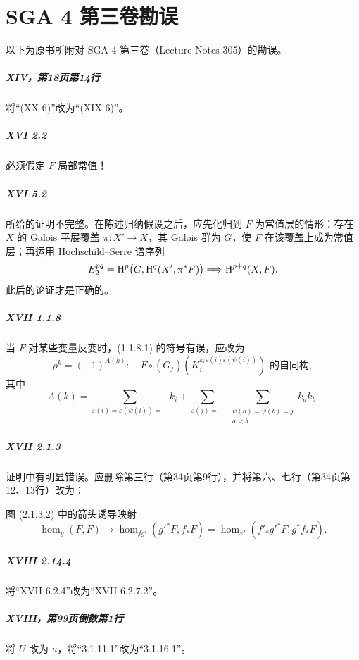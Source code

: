 \chapter{SGA 4 第三卷勘误}
以下为原书所附对 SGA 4 第三卷（Lecture Notes 305）的勘误。

\paragraph{XIV，第18页第14行}
将“(XX 6)”改为“(XIX 6)”。

\paragraph{XVI 2.2}
必须假定 $F$ 局部常值！

\paragraph{XVI 5.2}
所给的证明不完整。在陈述归纳假设之后，应先化归到 $F$ 为常值层的情形：存在 $X$ 的 Galois 平展覆盖 $\pi:X'\to X$，其 Galois 群为 $G$，使 $F$ 在该覆盖上成为常值层；再运用 Hochschild--Serre 谱序列
\[
E_2^{pq}=\operatorname{H}^p\bigl(G,\operatorname{H}^q(X',\pi^*F)\bigr)\Longrightarrow\operatorname{H}^{p+q}(X,F).
\]
此后的论证才是正确的。

\paragraph{XVII 1.1.8}
当 $F$ 对某些变量反变时，(1.1.8.1) 的符号有误，应改为
\begin{equation*}\tag{1.1.8.1}
\rho^{\underline k}=(-1)^{A(\underline k)}:\quad
F\circ(G_j)\left(K_i^{k_i\varepsilon(i)\varepsilon(\psi(i))}\right)
\text{ 的自同构},
\end{equation*}
其中
\[
A(\underline k)=
\sum_{\varepsilon(i)=\varepsilon(\psi(i))=-}k_i+
\sum_{\varepsilon(j)=-}\ \sum_{\substack{\psi(a)=\psi(b)=j\\a<b}}k_ak_b.
\]

\paragraph{XVII 2.1.3}
证明中有明显错误。应删除第三行（第34页第9行），并将第六、七行（第34页第12、13行）改为：

图 (2.1.3.2) 中的箭头诱导映射
\[
\hom_y(F,F)\longrightarrow
\hom_{fg'}(g'^*F,f_*F)
=\hom_{x'}(f'_*g'^*F,g^*f_*F).
\]

\paragraph{XVIII 2.14.4}
将“XVII 6.2.4”改为“XVII 6.2.7.2”。

\paragraph{XVIII，第99页倒数第1行}
将 $U$ 改为 $u$，将“3.1.11.1”改为“3.1.16.1”。
